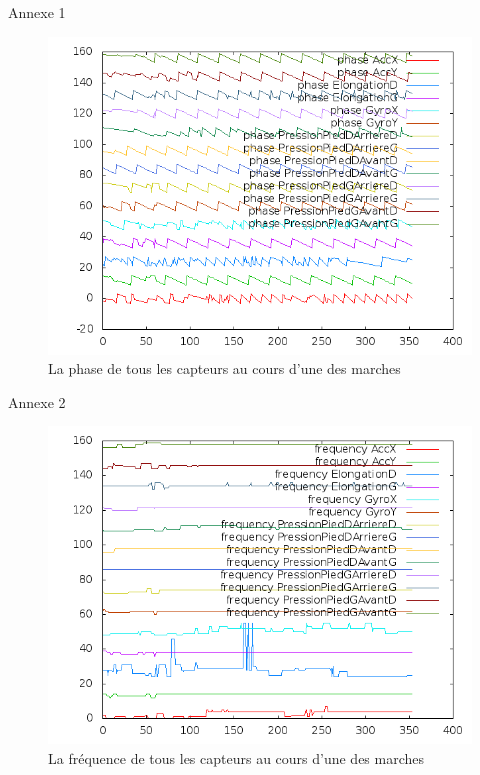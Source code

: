 \documentclass{beamer}
\begin{document}
\begin{frame}{Annexe 1}
    \begin{figure}[h]
        \includegraphics[scale=0.4]{../report/all_sensor_phases.png}
        \caption{La phase de tous les capteurs au cours d'une des marches}
    \end{figure}
\end{frame}

\begin{frame}{Annexe 2}
    \begin{figure}[h]
        \includegraphics[scale=0.4]{../report/all_sensor_freq.png}
        \caption{La fréquence de tous les capteurs au cours d'une des marches}
    \end{figure}
\end{frame}
\end{document}
